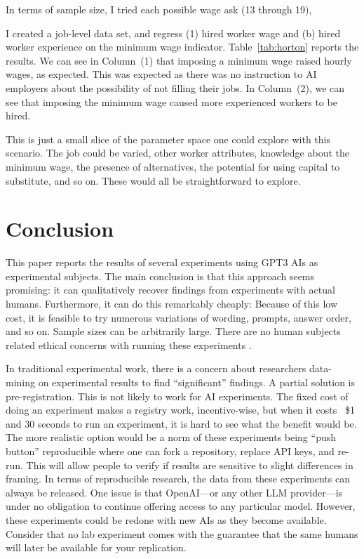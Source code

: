 \documentclass[11pt]{article}
\begin{document}
In terms of sample size, I tried each possible wage ask (13 through 19), 

I created a job-level data set, and regress (1) hired worker wage and (b) hired worker experience on the minimum wage indicator.
Table~\ref{tab:horton} reports the results.
We can see in Column~(1) that imposing a minimum wage raised hourly wages, as expected. 
This was expected as there was no instruction to AI employers about the possibility of not filling their jobs.
In Column~(2), we can see that imposing the minimum wage caused more experienced workers to be hired. 



This is just a small slice of the parameter space one could explore with this scenario.
The job could be varied, other worker attributes, knowledge about the minimum wage, the presence of alternatives, the potential for using capital to substitute, and so on. 
These would all be straightforward to explore.

\section{Conclusion} \label{sec:conclusion}
This paper reports the results of several experiments using GPT3 AIs as experimental subjects.
The main conclusion is that this approach seems promising: it can qualitatively recover findings from experiments with actual humans.
Furthermore, it can do this remarkably cheaply: 
Because of this low cost, it is feasible to try numerous variations of wording, prompts, answer order, and so on.
Sample sizes can be arbitrarily large. 
There are no human subjects related ethical concerns with running these experiments \citep{kessler2019}.

In traditional experimental work, there is a concern about researchers data-mining on experimental results to find ``significant'' findings. 
A partial solution is pre-registration. 
This is not likely to work for AI experiments. 
The fixed cost of doing an experiment makes a registry work, incentive-wise, but when it costs ~\$1 and 30 seconds to run an experiment, it is hard to see what the benefit would be.
The more realistic option would be a norm of these experiments being ``push button'' reproducible where one can fork a repository, replace API keys, and re-run.
This will allow people to verify if results are sensitive to slight differences in framing.  
In terms of reproducible research, the data from these experiments can
always be released.
One issue is that OpenAI---or any other LLM provider---is under no obligation to continue offering access to any particular model.
However, these experiments could be redone with new AIs as they become available.
Consider that no lab experiment comes with the guarantee that the same humans will later be available for your replication.

\newpage \clearpage 


\end{document}
